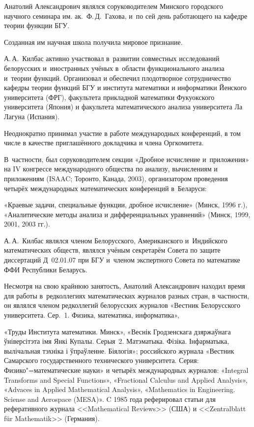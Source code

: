 Анатолий Александрович являлся соруководителем Минского городского научного семинара им. ак.~Ф.\,Д.~Гахова, и~по сей день работающего  на кафедре теории функции БГУ. 

Созданная им научная школа получила мировое признание.



А.\,А.~Килбас  активно участвовал в~развитии совместных исследований белорусских и~иностранных учёных в~области функционального анализа и~теории функций. Организовал и обеспечил плодотворное сотрудничество кафедры теории функций БГУ и института математики и информатики Йенского университета (ФРГ), факультета прикладной математики Фукуокского университета (Япония) и факультета математического анализа университета Ла Лагуна (Испания). 

Неоднократно принимал участие в работе международных конференций, в том числе в качестве приглашённого докладчика и члена Оргкомитета. 

В~частности, был соруководителем секции «Дробное исчисление и~приложения» на IV конгрессе международного общества по анализу, вычислениям и приложениям (ISAAC; Торонто, Канада, 2003), организатором проведения четырёх международных математических конференций в~Беларуси: 

«Краевые задачи, специальные функции, дробное исчисление» (Минск, 1996 г.), «Аналитические методы анализа и дифференциальных уравнений» (Минск, 1999, 2001, 2003 гг.).



А.\,А.~Килбас  являлся членом Белорусского, Американского и~Индийского математических обществ, являлся учёным секретарём Совета по защите диссертаций Д~02.01.07 при БГУ и~членом экспертного Совета по математике ФФИ Республики Беларусь.



Несмотря на свою крайнюю занятость, Анатолий Александрович находил время для работы в~редколлегиях математических журналов разных стран, в частности, он являлся членом редколлегий белорусских журналов «Вестник Белорусского университета. Сер.~1. Физика, математика, информатика», 

«Труды Института математики. Минск», «Веснік Гродзенскага дзяржаўнага ўніверсітэта імя Янкі Купалы.  Серыя~2. Матэматыка. Фізіка. Інфарматыка, вылічальная тэхніка і ўпраўленне. Біялогія»; российского журнала «Вестник Самарского государственного технического университета. Серия: Физико"=математические науки» и четырёх международных журналов: «Integral Transforms and Special Functions», «Fractional Calculus and Applied Analysis», «Advaces in Applied Mathematical Analysis», «Mathematics in Engineering. Scien\-se and Aerospace (MESA)». C 1985 года реферировал статьи для реферативного журнала <<Mathematical Reviews>> (США) и <<Zentralblatt f\"{u}r Mathematik>> (Германия). 



